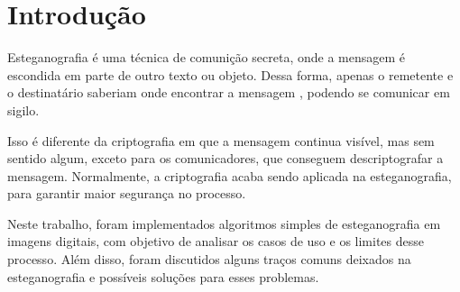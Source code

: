 \section{Introdução}

Esteganografia é uma técnica de comunição secreta, onde a mensagem é escondida em parte de outro texto ou objeto. Dessa forma, apenas o remetente e o destinatário saberiam onde encontrar a mensagem , podendo se comunicar em sigilo.


Isso é diferente da criptografia em que a mensagem continua visível, mas sem sentido algum, exceto para os comunicadores, que conseguem descriptografar a mensagem. Normalmente, a criptografia acaba sendo aplicada na esteganografia, para garantir maior segurança no processo.

Neste trabalho, foram implementados algoritmos simples de esteganografia em imagens digitais, com objetivo de analisar os casos de uso e os limites desse processo. Além disso, foram discutidos alguns traços comuns deixados na esteganografia e possíveis soluções para esses problemas.
